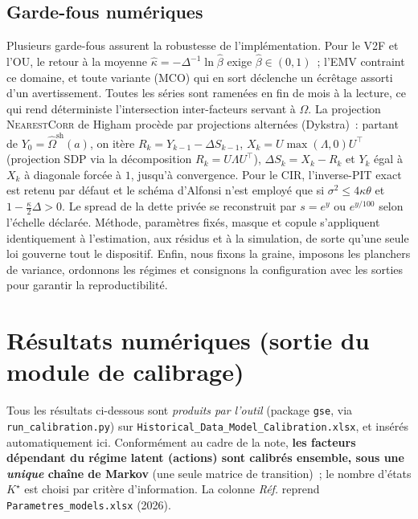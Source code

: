 \documentclass[11pt,a4paper]{article}
\theoremstyle{definition}
\newcommand{\transp}{^{\!\top}}
\newcommand{\Dt}{\Delta}
\begin{document}
\subsection{Garde-fous numériques}
Plusieurs garde-fous assurent la robustesse de l'implémentation. Pour le V2F et l'OU, le retour à la moyenne $\hat\kappa=-\Dt^{-1}\ln\hat\beta$ exige $\hat\beta\in(0,1)$~; l'EMV contraint ce domaine, et toute variante (MCO) qui en sort déclenche un écrêtage assorti d'un avertissement. Toutes les séries sont ramenées en fin de mois à la lecture, ce qui rend déterministe l'intersection inter-facteurs servant à $\Omega$. La projection \textsc{NearestCorr} de Higham procède par projections alternées (Dykstra)~: partant de $Y_0=\widehat\Omega^{\mathrm{sh}}(a)$, on itère $R_k=Y_{k-1}-\Delta S_{k-1}$, $X_k=U\max(\Lambda,0)U\transp$ (projection SDP via la décomposition $R_k=U\Lambda U\transp$), $\Delta S_k=X_k-R_k$ et $Y_k$ égal à $X_k$ à diagonale forcée à $1$, jusqu'à convergence. Pour le CIR, l'inverse-PIT exact est retenu par défaut et le schéma d'Alfonsi n'est employé que si $\sigma^2\le4\kappa\theta$ et $1-\tfrac{\kappa}{2}\Dt>0$. Le spread de la dette privée se reconstruit par $s=e^y$ ou $e^{y/100}$ selon l'échelle déclarée. Méthode, paramètres fixés, masque et copule s'appliquent identiquement à l'estimation, aux résidus et à la simulation, de sorte qu'une seule loi gouverne tout le dispositif. Enfin, nous fixons la graine, imposons les planchers de variance, ordonnons les régimes et consignons la configuration avec les sorties pour garantir la reproductibilité.

\section{Résultats numériques (sortie du module de calibrage)}
\label{sec:resultats}
Tous les résultats ci-dessous sont \emph{produits par l'outil} (package \texttt{gse}, via \texttt{run\_calibration.py}) sur \texttt{Historical\_Data\_\allowbreak Model\_\allowbreak Calibration.xlsx}, et insérés automatiquement ici. Conformément au cadre de la note, \textbf{les facteurs dépendant du régime latent (actions) sont calibrés ensemble, sous une \emph{unique} chaîne de Markov} (une seule matrice de transition)~; le nombre d'états $K^\star$ est choisi par critère d'information. La colonne \emph{Réf.} reprend \texttt{Parametres\_models.xlsx} (2026).
\end{document}
